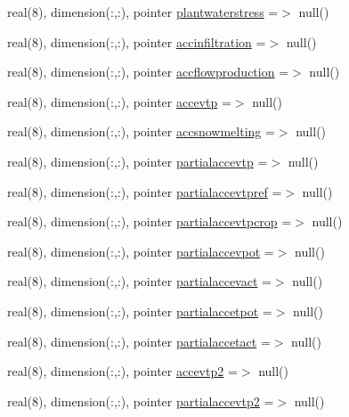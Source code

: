 \begin{DoxyCompactItemize}
\item 
real(8), dimension(\+:,\+:), pointer \mbox{\hyperlink{structmodulebasin_1_1t__basin_a200ab21a500f0d08f35012b09b45375c}{plantwaterstress}} =$>$ null()
\item 
real(8), dimension(\+:,\+:), pointer \mbox{\hyperlink{structmodulebasin_1_1t__basin_acfef2a45ff6a61b4eba9eac9d5e1307e}{accinfiltration}} =$>$ null()
\item 
real(8), dimension(\+:,\+:), pointer \mbox{\hyperlink{structmodulebasin_1_1t__basin_ae4ae6c6c5c3fe3412277b1fa91ba6660}{accflowproduction}} =$>$ null()
\item 
real(8), dimension(\+:,\+:), pointer \mbox{\hyperlink{structmodulebasin_1_1t__basin_a9e0d5492532f7989f870aebd35c6d1d7}{accevtp}} =$>$ null()
\item 
real(8), dimension(\+:,\+:), pointer \mbox{\hyperlink{structmodulebasin_1_1t__basin_a98e5a5851646d4354f1ff5b4830e17e2}{accsnowmelting}} =$>$ null()
\item 
real(8), dimension(\+:,\+:), pointer \mbox{\hyperlink{structmodulebasin_1_1t__basin_a14977a8791c7985ac6746deafdd4b3d8}{partialaccevtp}} =$>$ null()
\item 
real(8), dimension(\+:,\+:), pointer \mbox{\hyperlink{structmodulebasin_1_1t__basin_a608ffce310667dd750177d6c81aa4633}{partialaccevtpref}} =$>$ null()
\item 
real(8), dimension(\+:,\+:), pointer \mbox{\hyperlink{structmodulebasin_1_1t__basin_a3daa9dd7222fe0475bf28c92d974a239}{partialaccevtpcrop}} =$>$ null()
\item 
real(8), dimension(\+:,\+:), pointer \mbox{\hyperlink{structmodulebasin_1_1t__basin_aa06d39236ef3246e7205b7d68fccf7ad}{partialaccevpot}} =$>$ null()
\item 
real(8), dimension(\+:,\+:), pointer \mbox{\hyperlink{structmodulebasin_1_1t__basin_aaeb5abd8f7e5221ba8617f4f37291cf3}{partialaccevact}} =$>$ null()
\item 
real(8), dimension(\+:,\+:), pointer \mbox{\hyperlink{structmodulebasin_1_1t__basin_ab7b783c77fec992ec665e89413ad19df}{partialaccetpot}} =$>$ null()
\item 
real(8), dimension(\+:,\+:), pointer \mbox{\hyperlink{structmodulebasin_1_1t__basin_ae1483b101b7098af4b115ea5fbddaee4}{partialaccetact}} =$>$ null()
\item 
real(8), dimension(\+:,\+:), pointer \mbox{\hyperlink{structmodulebasin_1_1t__basin_abb8c48be4f67d76d3810345da3dbe1aa}{accevtp2}} =$>$ null()
\item 
real(8), dimension(\+:,\+:), pointer \mbox{\hyperlink{structmodulebasin_1_1t__basin_a54476cfe6c14a88ac08b38eaa13083c7}{partialaccevtp2}} =$>$ null()

\end{DoxyCompactItemize}
